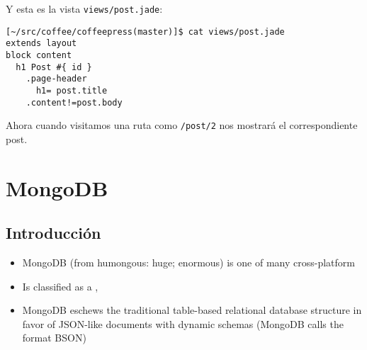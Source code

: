 Y esta es la vista \verb|views/post.jade|:
\begin{verbatim}
[~/src/coffee/coffeepress(master)]$ cat views/post.jade 
extends layout
block content
  h1 Post #{ id }
    .page-header
      h1= post.title
    .content!=post.body
\end{verbatim}
Ahora cuando visitamos una ruta como \verb|/post/2| nos mostrará el correspondiente post.

\section{MongoDB}

\subsection{Introducción}
\begin{itemize}
\item
MongoDB (from humongous: huge; enormous) is one of many cross-platform 
\item
Is classified as a 
,
\item
MongoDB eschews the traditional table-based relational database structure in favor of JSON-like documents with dynamic schemas (MongoDB calls the format BSON)
\end{itemize}


